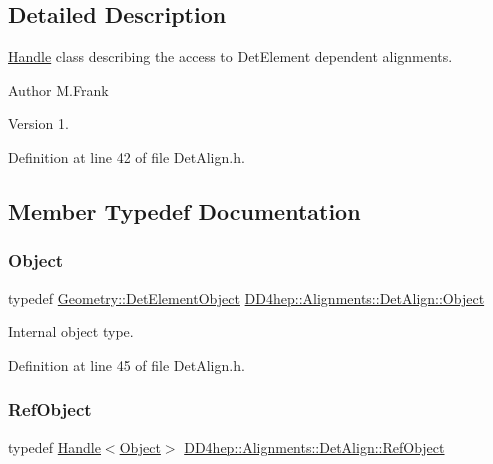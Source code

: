 \subsection{Detailed Description}
\hyperlink{class_d_d4hep_1_1_handle}{Handle} class describing the access to Det\+Element dependent alignments. 

\begin{DoxyAuthor}{Author}
M.\+Frank 
\end{DoxyAuthor}
\begin{DoxyVersion}{Version}
1. 
\end{DoxyVersion}


Definition at line 42 of file Det\+Align.\+h.



\subsection{Member Typedef Documentation}
\hypertarget{class_d_d4hep_1_1_alignments_1_1_det_align_ae49c039feb46ce85c64fecb6cf669f45}{}\label{class_d_d4hep_1_1_alignments_1_1_det_align_ae49c039feb46ce85c64fecb6cf669f45} 
\subsubsection{\texorpdfstring{Object}{Object}}
{\footnotesize\ttfamily typedef \hyperlink{class_d_d4hep_1_1_geometry_1_1_det_element_object}{Geometry\+::\+Det\+Element\+Object} \hyperlink{class_d_d4hep_1_1_alignments_1_1_det_align_ae49c039feb46ce85c64fecb6cf669f45}{D\+D4hep\+::\+Alignments\+::\+Det\+Align\+::\+Object}}



Internal object type. 



Definition at line 45 of file Det\+Align.\+h.

\hypertarget{class_d_d4hep_1_1_alignments_1_1_det_align_aefb28d8de174c8d7efe86b45829701ff}{}\label{class_d_d4hep_1_1_alignments_1_1_det_align_aefb28d8de174c8d7efe86b45829701ff} 
\subsubsection{\texorpdfstring{Ref\+Object}{RefObject}}
{\footnotesize\ttfamily typedef \hyperlink{class_d_d4hep_1_1_handle}{Handle}$<$\hyperlink{class_d_d4hep_1_1_alignments_1_1_det_align_ae49c039feb46ce85c64fecb6cf669f45}{Object}$>$ \hyperlink{class_d_d4hep_1_1_alignments_1_1_det_align_aefb28d8de174c8d7efe86b45829701ff}{D\+D4hep\+::\+Alignments\+::\+Det\+Align\+::\+Ref\+Object}}



